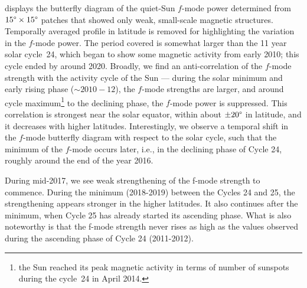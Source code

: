 \documentclass{aa}
\begin{document}
 displays the butterfly diagram of the quiet-Sun $f$-mode power determined
from $15\degree \times 15\degree$ patches that showed only weak, small-scale magnetic structures.
Temporally averaged profile in latitude is removed for highlighting the variation in the
$f$-mode power. The period covered is somewhat larger than the 11 year solar cycle~24, which
began to show some magnetic activity from early 2010; this cycle ended by around 2020.
Broadly, we find an anti-correlation of the $f$-mode strength with the activity cycle of the
Sun --- during the solar minimum and early rising phase ($\sim 2010-12$), the $f$-mode strengths
are larger, and around cycle maximum\footnote{the Sun reached its peak magnetic activity
in terms of number of sunspots during the cycle~24 in April 2014.} to the declining phase,
the $f$-mode power is suppressed.
This correlation is strongest near the solar equator, within about $\pm 20\degree$ in
latitude, and it decreases with higher latitudes.
Interestingly, we observe a temporal shift in the $f$-mode butterfly diagram with respect to the
solar cycle, such that the minimum of the $f$-mode occurs later, i.e., in the declining phase of
Cycle 24, roughly around the end of the year 2016.


During mid-2017, we see weak strengthening of the f-mode strength to commence. During the minimum (2018-2019) between the Cycles 24 and 25, the strengthening appears stronger in the higher latitudes. It also continues after the minimum, when Cycle 25 has already started its ascending phase. What is also noteworthy is that the f-mode strength never rises as high as the values observed during the ascending phase of Cycle 24 (2011-2012).


\end{document}
